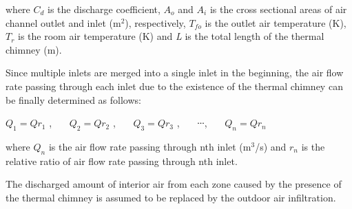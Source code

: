 where \(C_{d}\) is the discharge coefficient, \(A_{o}\) and \(A_{i}\) is the cross sectional areas of air channel outlet and inlet (m\(^{2}\)), respectively, \(T_{fo}\) is the outlet air temperature (K), \(T_{r}\) is the room air temperature (K) and \emph{L} is the total length of the thermal chimney (m).

Since multiple inlets are merged into a single inlet in the beginning, the air flow rate passing through each inlet due to the existence of the thermal chimney can be finally determined as follows:

\({Q_1} = Q{r_1}\) ,~~~ \({Q_2} = Q{r_2}\) ,~~~ \({Q_3} = Q{r_3}\) ,~~~ ∙∙∙,~~~ \({Q_n} = Q{r_n}\)

where \(Q_{n}\) is the air flow rate passing through nth inlet (m\(^{3}\)/s) and \(r_{n}\) is the relative ratio of air flow rate passing through nth inlet.

The discharged amount of interior air from each zone caused by the presence of the thermal chimney is assumed to be replaced by the outdoor air infiltration.


